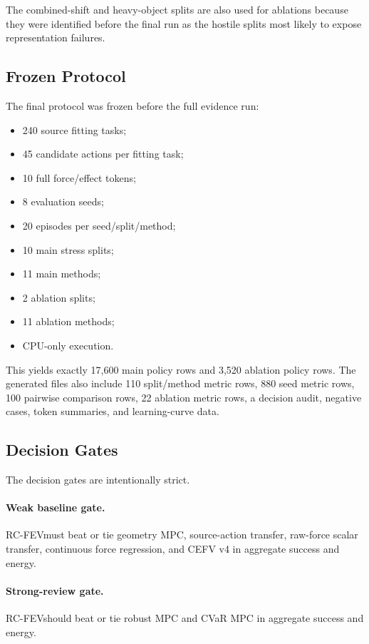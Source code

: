 \documentclass{article}
\newcommand{\method}{RC-FEV}
\begin{document}
The combined-shift and heavy-object splits are also used for ablations because they were identified before the final run as the hostile splits most likely to expose representation failures.

\subsection{Frozen Protocol}

The final protocol was frozen before the full evidence run:

\begin{itemize}
\item 240 source fitting tasks;
\item 45 candidate actions per fitting task;
\item 10 full force/effect tokens;
\item 8 evaluation seeds;
\item 20 episodes per seed/split/method;
\item 10 main stress splits;
\item 11 main methods;
\item 2 ablation splits;
\item 11 ablation methods;
\item CPU-only execution.
\end{itemize}

This yields exactly 17,600 main policy rows and 3,520 ablation policy rows. The generated files also include 110 split/method metric rows, 880 seed metric rows, 100 pairwise comparison rows, 22 ablation metric rows, a decision audit, negative cases, token summaries, and learning-curve data.

\subsection{Decision Gates}

The decision gates are intentionally strict.

\paragraph{Weak baseline gate.}
\method must beat or tie geometry MPC, source-action transfer, raw-force scalar transfer, continuous force regression, and CEFV v4 in aggregate success and energy.

\paragraph{Strong-review gate.}
\method should beat or tie robust MPC and CVaR MPC in aggregate success and energy.
\end{document}
